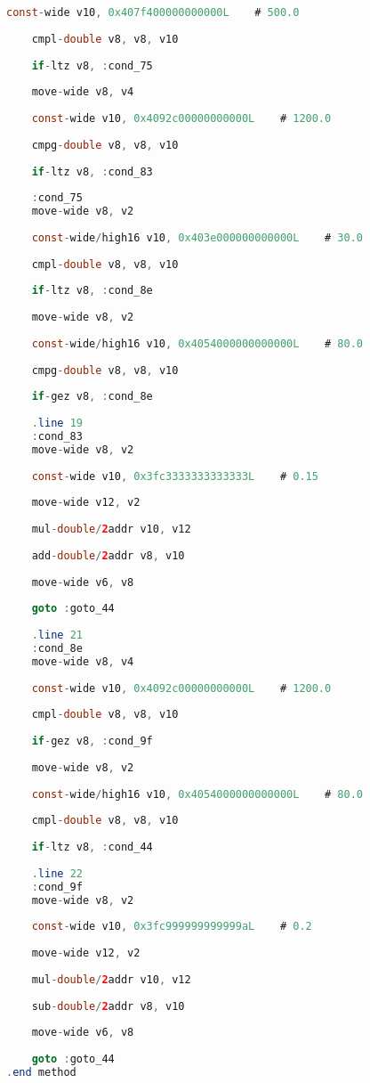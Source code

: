 \documentclass[hidelinks,12pt]{article}
\begin{document}
\begin{lstlisting}[caption=Smali resultante do .java,language=java]
	const-wide v10, 0x407f400000000000L    # 500.0
	
	cmpl-double v8, v8, v10
	
	if-ltz v8, :cond_75
	
	move-wide v8, v4
	
	const-wide v10, 0x4092c00000000000L    # 1200.0
	
	cmpg-double v8, v8, v10
	
	if-ltz v8, :cond_83
	
	:cond_75
	move-wide v8, v2
	
	const-wide/high16 v10, 0x403e000000000000L    # 30.0
	
	cmpl-double v8, v8, v10
	
	if-ltz v8, :cond_8e
	
	move-wide v8, v2
	
	const-wide/high16 v10, 0x4054000000000000L    # 80.0
	
	cmpg-double v8, v8, v10
	
	if-gez v8, :cond_8e
	
	.line 19
	:cond_83
	move-wide v8, v2
	
	const-wide v10, 0x3fc3333333333333L    # 0.15
	
	move-wide v12, v2
	
	mul-double/2addr v10, v12
	
	add-double/2addr v8, v10
	
	move-wide v6, v8
	
	goto :goto_44
	
	.line 21
	:cond_8e
	move-wide v8, v4
	
	const-wide v10, 0x4092c00000000000L    # 1200.0
	
	cmpl-double v8, v8, v10
	
	if-gez v8, :cond_9f
	
	move-wide v8, v2
	
	const-wide/high16 v10, 0x4054000000000000L    # 80.0
	
	cmpl-double v8, v8, v10
	
	if-ltz v8, :cond_44
	
	.line 22
	:cond_9f
	move-wide v8, v2
	
	const-wide v10, 0x3fc999999999999aL    # 0.2
	
	move-wide v12, v2
	
	mul-double/2addr v10, v12
	
	sub-double/2addr v8, v10
	
	move-wide v6, v8
	
	goto :goto_44
.end method	
	
	\end{lstlisting}
	
\end{document}
